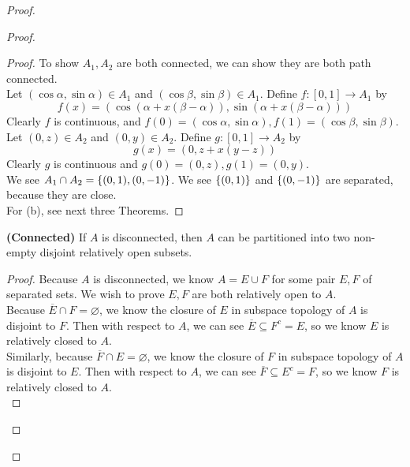 \documentclass{report}
\begin{document}
\begin{proof}
\begin{proof}
\begin{proof}
To show $A_1,A_2$ are both connected, we can show they are both path connected.\\

Let $(\cos \alpha ,\sin \alpha  )\in A_1$ and $(\cos \beta ,\sin \beta )\in A_1$. Define $f:[0,1]\rightarrow A_1$ by
\begin{equation}
 f(x)=(\cos (\alpha +x(\beta -\alpha )), \sin (\alpha +x(\beta -\alpha )))
\end{equation}
Clearly $f$ is continuous, and  $f(0)=(\cos \alpha ,\sin \alpha ),f(1)=(\cos \beta ,\sin \beta )$.\\

Let $(0,z)\in A_2$ and $(0,y)\in A_2$. Define $g:[0,1]\rightarrow A_2$ by
\begin{equation}
g(x)=(0,z+x(y-z))
\end{equation}
Clearly $g$ is continuous and  $g(0)=(0,z),g(1)=(0,y)$.\\


We see $A_1\cap A_2=\{ (0,1),(0,-1) \}$. We see $\{ (0,1) \}$ and $\{ (0,-1) \}$ are separated, because they are close.\\

For (b), see next three Theorems.
\end{proof}
\begin{theorem}
\label{6.3.1}
\textbf{(Connected)} If $A$ is disconnected, then $A$ can be partitioned into two non-empty disjoint relatively open subsets. 
\end{theorem}
\begin{proof}
Because $A$ is disconnected, we know  $A=E\cup F$ for some pair $E,F$ of separated sets. We wish to prove $E,F$ are both relatively open to $A$.\\

Because $\overline{E}\cap F=\varnothing$, we know the closure of $E$ in subspace topology of $A$ is disjoint to $F$. Then with respect to $A$, we can see $\overline{E}\subseteq F^c=E$, so we know $E$ is relatively closed to  $A$.\\


Similarly, because $\overline{F}\cap E=\varnothing$, we know the closure of $F$ in subspace topology of $A$ is disjoint to $E$. Then with respect to $A$, we can see $\overline{F}\subseteq E^c=F$, so we know $F$ is relatively closed to  $A$.\\


\end{proof}
\end{proof}
\end{proof}
\end{document}
